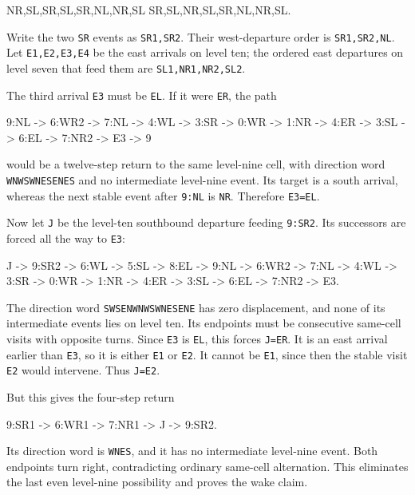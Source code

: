 \documentclass[11pt,letterpaper]{article}
\theoremstyle{plain}
\theoremstyle{definition}
\begin{document}
\begin{NoHyper}
\begin{codeblock}
NR,SL,SR,SL,SR,NL,NR,SL
SR,SL,NR,SL,SR,NL,NR,SL.
\end{codeblock}

Write the two \texttt{SR} events as \texttt{SR1,SR2}. Their west-departure order is \texttt{SR1,SR2,NL}. Let \texttt{E1,E2,E3,E4} be the east arrivals on level ten; the ordered east departures on level seven that feed them are \texttt{SL1,NR1,NR2,SL2}.

The third arrival \texttt{E3} must be \texttt{EL}. If it were \texttt{ER}, the path

\begin{codeblock}
9:NL -> 6:WR2 -> 7:NL -> 4:WL -> 3:SR -> 0:WR
     -> 1:NR -> 4:ER -> 3:SL -> 6:EL -> 7:NR2 -> E3 -> 9
\end{codeblock}

would be a twelve-step return to the same level-nine cell, with direction word \texttt{WNWSWNESENES} and no intermediate level-nine event. Its target is a south arrival, whereas the next stable event after \texttt{9:NL} is \texttt{NR}. Therefore \texttt{E3=EL}.

Now let \texttt{J} be the level-ten southbound departure feeding \texttt{9:SR2}. Its successors are forced all the way to \texttt{E3}:

\begin{codeblock}
J -> 9:SR2 -> 6:WL -> 5:SL -> 8:EL -> 9:NL
  -> 6:WR2 -> 7:NL -> 4:WL -> 3:SR -> 0:WR
  -> 1:NR -> 4:ER -> 3:SL -> 6:EL -> 7:NR2 -> E3.
\end{codeblock}

The direction word \texttt{SWSENWNWSWNESENE} has zero displacement, and none of its intermediate events lies on level ten. Its endpoints must be consecutive same-cell visits with opposite turns. Since \texttt{E3} is \texttt{EL}, this forces \texttt{J=ER}. It is an east arrival earlier than \texttt{E3}, so it is either \texttt{E1} or \texttt{E2}. It cannot be \texttt{E1}, since then the stable visit \texttt{E2} would intervene. Thus \texttt{J=E2}.

But this gives the four-step return

\begin{codeblock}
9:SR1 -> 6:WR1 -> 7:NR1 -> J -> 9:SR2.
\end{codeblock}

Its direction word is \texttt{WNES}, and it has no intermediate level-nine event. Both endpoints turn right, contradicting ordinary same-cell alternation. This eliminates the last even level-nine possibility and proves the wake claim.


\end{NoHyper}
\end{document}
